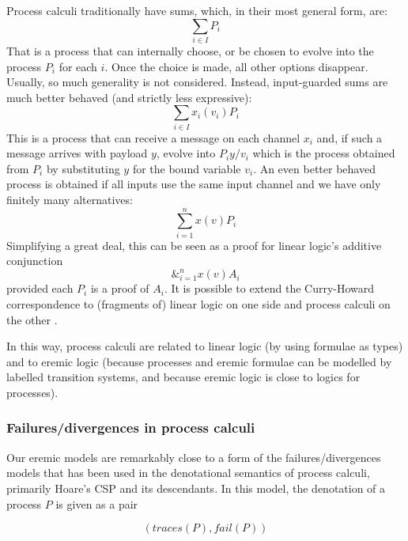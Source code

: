 Process calculi traditionally have sums, which, in their most general
form, are:
\[
     \sum_{i \in I} P_i
\]
That is a process that can internally choose, or be chosen to evolve
into the process $P_i$ for each $i$. Once the choice is made, all
other options disappear.  Usually, so much generality is not
considered. Instead, input-guarded sums are much better behaved (and
strictly less expressive):
  \[
     \sum_{i \in I} x_{i}(v_i)P_i
  \]
This is a process that can receive a message on each channel $x_i$
and, if such a message arrives with payload $y$, evolve into
$P_i{y/v_i}$ which is the process obtained from $P_i$ by substituting
$y$ for the bound variable $v_i$.  An even better behaved process is
obtained if all inputs use the same input channel and we have only
finitely many alternatives:
  \[
     \sum_{i = 1}^n x(v)P_i
  \]
  Simplifying a great deal, this can be seen as a proof for linear
  logic's additive conjunction
  \[
     \&_{i = 1}^n x(v)A_i
  \]
  provided each $P_i$ is a proof of $A_i$.  It is possible to extend
  the Curry-Howard correspondence to (fragments of) linear logic on
  one side and process calculi on the other \cite{GaySJ:typcalosp}.

In this way, process calculi are related to linear logic (by using
formulae as types) and to eremic logic (because processes and eremic
formulae can be modelled by labelled transition systems, and because
eremic logic is close to logics for processes).

\subsubsection{Failures/divergences in process calculi}

Our eremic models are remarkably close to a form of the
failures/divergences models that has been used in the denotational
semantics of process calculi, primarily Hoare's CSP
\cite{HoareC:comseq,RoscoeAW:theapoc} and its descendants.  In this
model, the denotation of a process $P$ is given as a pair

\[
   (traces(P), fail(P))
\]

